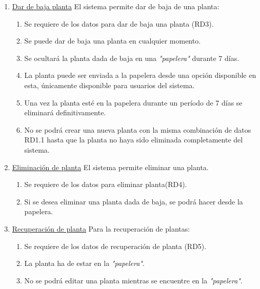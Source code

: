 \documentclass[10pt,a4paper]{article}
\begin{document}
\begin{enumerate}[label=RF\arabic*. ,leftmargin=2.8\parindent]
	\bigskip
	\item \underline{Dar de baja planta}
	\newline \newline
	El sistema permite dar de baja de una planta:
	\begin{enumerate}[label=-]
		\item Se requiere de los datos para dar de baja una planta (RD3).
		\item Se puede dar de baja una planta en cualquier momento.
		\item Se ocultará la planta dada de baja en una \textit{"papelera"} durante 7 días.
		\item La planta puede ser enviada a la papelera desde una opción disponible en esta, únicamente disponible para usuarios del sistema.		
		\item Una vez la planta esté en la papelera durante un período de 7 días se eliminará definitivamente.
		\item No se podrá crear una nueva planta con la misma combinación de datos RD1.1 hasta que la planta no haya sido eliminada completamente del sistema.
	\end{enumerate}

	\bigskip
	\item \underline{Eliminación de planta}
	\newline \newline
	El sistema permite eliminar una planta.
	\begin{enumerate}[label=-]
	\item Se requiere de los datos para eliminar planta(RD4).
		\item Si se desea eliminar una planta dada de baja, se podrá hacer desde la papelera.
	\end{enumerate}

	\bigskip
	\item \underline{Recuperación de planta}
	\newline \newline
	Para la recuperación de plantas:
	\begin{enumerate}[label=-]
	\item Se requiere de los datos de recuperación de planta (RD5).
	\item La planta ha de estar en la \textit{"papelera"}.
	\item No se podrá editar una planta mientras se encuentre en la \textit{"papelera"}.
	\end{enumerate}


\end{enumerate}
\end{document}
